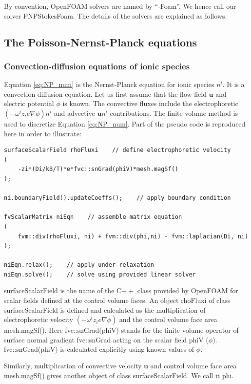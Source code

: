 By convention, OpenFOAM solvers are named by ``-Foam''. We hence call our solver PNPStokesFoam. The details of the solvers are explained as follows.

\subsection{The Poisson-Nernst-Planck equations}
\subsubsection{Convection-diffusion equations of ionic species}
Equation \ref{eq:NP_num} is the Nernst-Planck equation for ionic species $n^i$. It is a convection-diffusion equation. Let us first assume that the flow field $\mathbf{u}$ and electric potential $\phi$ is known. The convective fluxes include the electrophoretic  $(-\omega^iz_ie\nabla\phi)n^i$ and advective $\mathbf{u}n^i$ contributions. The finite volume method is used to discretize Equation \ref{eq:NP_num}. Part of the pseudo code is reproduced here in order to illustrate:

\begin{lstlisting}
surfaceScalarField rhoFluxi    // define electrophoretic velocity
(
	-zi*(Di/kB/T)*e*fvc::snGrad(phiV)*mesh.magSf()
);

ni.boundaryField().updateCoeffs();    // apply boundary condition

fvScalarMatrix niEqn    // assemble matrix equation
(
    fvm::div(rhoFluxi, ni) + fvm::div(phi,ni) - fvm::laplacian(Di, ni)
);  
      
niEqn.relax();    // apply under-relaxation
niEqn.solve();    // solve using provided linear solver
\end{lstlisting}

\textsf{surfaceScalarField} is the name of the C$++$ class provided by OpenFOAM for scalar fields defined at the control volume faces. An object \textsf{rhoFluxi} of class \textsf{surfaceScalarField} is defined and calculated as the multiplication of electrophoretic velocity $(-\omega^iz_ie\nabla\phi)$ and the control volume face area \textsf{mesh.magSf()}. Here \textsf{fvc::snGrad(phiV)} stands for the finite volume operator of surface normal gradient \textsf{fvc::snGrad} acting on the scalar field \textsf{phiV} ($\phi$). \textsf{fvc::snGrad(phiV)} is calculated explicitly using known values of $\phi$. 

Similarly, multiplication of convective velocity $\mathbf{u}$ and control volume face area \textsf{mesh.magSf()} gives another object of class \textsf{surfaceScalarField}. We call it \textsf{phi}.

